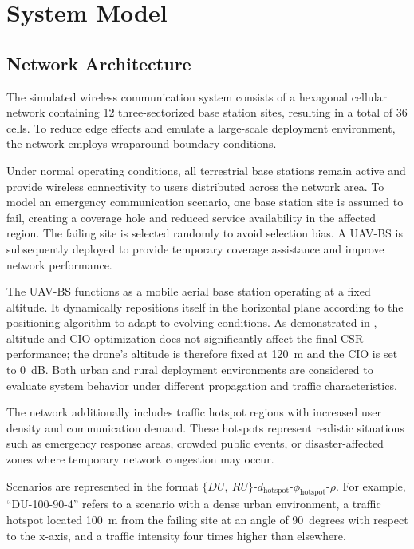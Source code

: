 \documentclass[12pt]{report}
\begin{document}
\chapter{System Model}
\label{ch:system}

\section{Network Architecture}

The simulated wireless communication system consists of a hexagonal cellular network containing 12 three-sectorized base station sites, resulting in a total of 36 cells. To reduce edge effects and emulate a large-scale deployment environment, the network employs wraparound boundary conditions.

Under normal operating conditions, all terrestrial base stations remain active and provide wireless connectivity to users distributed across the network area. To model an emergency communication scenario, one base station site is assumed to fail, creating a coverage hole and reduced service availability in the affected region. The failing site is selected randomly to avoid selection bias. A UAV-BS is subsequently deployed to provide temporary coverage assistance and improve network performance.

The UAV-BS functions as a mobile aerial base station operating at a fixed altitude. It dynamically repositions itself in the horizontal plane according to the positioning algorithm to adapt to evolving conditions. As demonstrated in \cite{pijnappel2024online}, altitude and CIO optimization does not significantly affect the final CSR performance; the drone's altitude is therefore fixed at 120~m and the CIO is set to 0~dB. Both urban and rural deployment environments are considered to evaluate system behavior under different propagation and traffic characteristics.

The network additionally includes traffic hotspot regions with increased user density and communication demand. These hotspots represent realistic situations such as emergency response areas, crowded public events, or disaster-affected zones where temporary network congestion may occur.

Scenarios are represented in the format $\{DU,\ RU\}$-$d_{\mathrm{hotspot}}$-$\phi_{\mathrm{hotspot}}$-$\rho$. For example, ``DU-100-90-4'' refers to a scenario with a dense urban environment, a traffic hotspot located 100~m from the failing site at an angle of 90~degrees with respect to the x-axis, and a traffic intensity four times higher than elsewhere.
\end{document}
